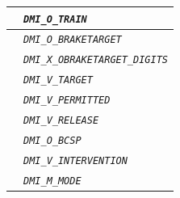 \begin{itemize}
\begin{longtable}{|l|l|}
				\hline

				&	\begin{minipage}[t]{0.78\linewidth} \emph{\texttt{DMI\_O\_TRAIN}} \end{minipage} \\

				\hline

				&	\begin{minipage}[t]{0.78\linewidth} \emph{\texttt{DMI\_O\_BRAKETARGET}} \end{minipage} \\

				\hline

				&	\begin{minipage}[t]{0.78\linewidth} \emph{\texttt{DMI\_X\_OBRAKETARGET\_DIGITS}} \end{minipage} \\

				\hline

				&	\begin{minipage}[t]{0.78\linewidth} \emph{\texttt{DMI\_V\_TARGET}} \end{minipage} \\
				\hline

				&	\begin{minipage}[t]{0.78\linewidth} \emph{\texttt{DMI\_V\_PERMITTED}} \end{minipage} \\

				\hline

				&	\begin{minipage}[t]{0.78\linewidth} \emph{\texttt{DMI\_V\_RELEASE}} \end{minipage} \\

				\hline

				&	\begin{minipage}[t]{0.78\linewidth} \emph{\texttt{DMI\_O\_BCSP}} \end{minipage} \\

				\hline

				&	\begin{minipage}[t]{0.78\linewidth} \emph{\texttt{DMI\_V\_INTERVENTION}} \end{minipage} \\

				\hline

				&	\begin{minipage}[t]{0.78\linewidth} \emph{\texttt{DMI\_M\_MODE}} \end{minipage} \\


\end{longtable}
\end{itemize}
